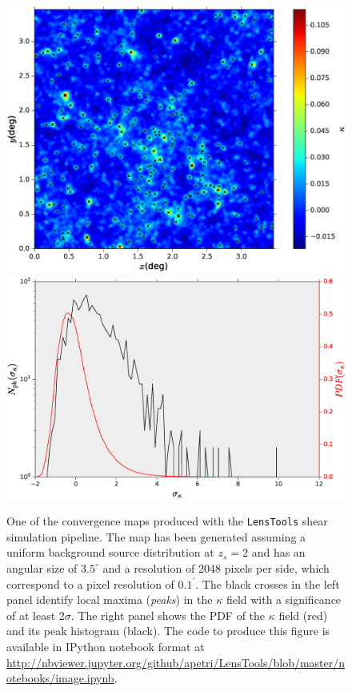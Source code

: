 \documentclass[5p]{elsarticle}
\newcommand{\LT}{\texttt{LensTools} }
\begin{document}
\begin{figure}
\begin{center}
\includegraphics[scale=0.35]{Figures/convergence_visualize.eps}
\includegraphics[scale=0.3]{Figures/convergence_stats.eps}
\caption{One of the convergence maps produced with the \LT shear simulation pipeline. The map has been generated assuming a uniform background source distribution at $z_s=2$ and has an angular size of $3.5^\circ$ and a resolution of 2048 pixels per side, which correspond to a pixel resolution of $0.1^\prime$. The black crosses in the left panel identify local maxima (\textit{peaks}) in the $\kappa$ field with a significance of at least 2$\sigma$. The right panel shows the PDF of the $\kappa$ field (red) and its peak histogram (black). The code to produce this figure is available in {\sc IPython} notebook format at \url{http://nbviewer.jupyter.org/github/apetri/LensTools/blob/master/notebooks/image.ipynb}.}
\label{convergencefig}
\end{center}
\end{figure}
\end{document}
